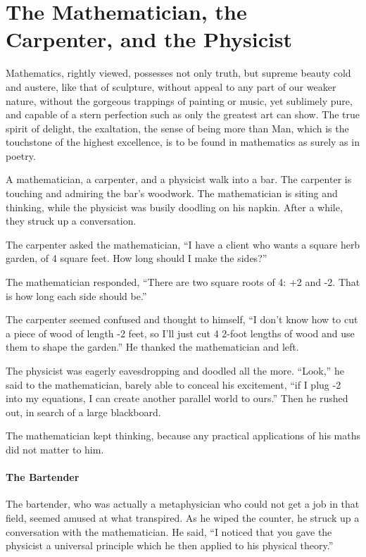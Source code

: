 \section{The Mathematician, the Carpenter, and the Physicist}

\begin{quotex}
Mathematics, rightly viewed, possesses not only truth, but supreme beauty cold and austere, like that of sculpture, without appeal to any part of our weaker nature, without the gorgeous trappings of painting or music, yet sublimely pure, and capable of a stern perfection such as only the greatest art can show. The true spirit of delight, the exaltation, the sense of being more than Man, which is the touchstone of the highest excellence, is to be found in mathematics as surely as in poetry.
\end{quotex}


A mathematician, a carpenter, and a physicist walk into a bar. The carpenter is touching and admiring the bar's woodwork. The mathematician is siting and thinking, while the physicist was busily doodling on his napkin. After a while, they struck up a conversation.

The carpenter asked the mathematician, ``I have a client who wants a square herb garden, of 4 square feet. How long should I make the sides?''

The mathematician responded, ``There are two square roots of 4: +2 and -2. That is how long each side should be.''

The carpenter seemed confused and thought to himself, ``I don't know how to cut a piece of wood of length -2 feet, so I'll just cut 4 2-foot lengths of wood and use them to shape the garden.'' He thanked the mathematician and left.

The physicist was eagerly eavesdropping and doodled all the more. ``Look,'' he said to the mathematician, barely able to conceal his excitement, ``if I plug -2 into my equations, I can create another parallel world to ours.'' Then he rushed out, in search of a large blackboard.

The mathematician kept thinking, because any practical applications of his maths did not matter to him.

\paragraph{The Bartender}


The bartender, who was actually a metaphysician who could not get a job in that field, seemed amused at what transpired. As he wiped the counter, he struck up a conversation with the mathematician. He said, ``I noticed that you gave the physicist a universal principle which he then applied to his physical theory.''


